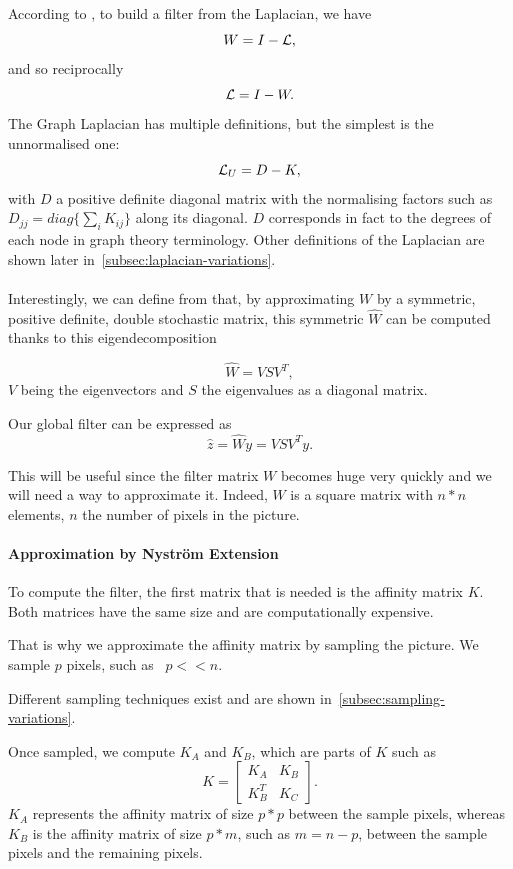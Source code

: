\paragraph{}
According to \cite{modern_tour_2013}, to build a filter from the Laplacian, we have
\[W = I - \operatorname{\mathcal{L}},\]
and so reciprocally
\[\operatorname{\mathcal{L}} = I - W.\]
The Graph Laplacian has multiple definitions, but the simplest is the unnormalised one:
\[\operatorname{\mathcal{L}}_U = D - K,\]
with \(D\) a positive definite diagonal matrix with the normalising factors such as \(D_{jj} = diag\{\sum_i K_{ij}\}\) along its diagonal.
\(D\) corresponds in fact to the degrees of each node in graph theory terminology.
Other definitions of the Laplacian are shown later in~\ref{subsec:laplacian-variations}.

\paragraph{}
Interestingly, we can define from \cite{glide_2014} that, by approximating \(W\) by a symmetric, positive definite, double stochastic matrix, this symmetric \(\hat{W}\) can be computed thanks to this eigendecomposition

\[\hat{W} = VSV^T,\]
\(V\) being the eigenvectors and \(S\) the eigenvalues as a diagonal matrix.

Our global filter can be expressed as
\[\hat{z} = \hat{W}y = VSV^Ty.\]

This will be useful since the filter matrix \(W\) becomes huge very quickly and we will need a way to approximate it. Indeed, \(W\) is a square matrix with \(n*n\) elements, \(n\) the number of pixels in the picture.

\paragraph{Approximation by Nystr\"om Extension}

To compute the filter, the first matrix that is needed is the affinity matrix \(K\).
Both matrices have the same size and are computationally expensive.

That is why we approximate the affinity matrix by sampling the picture.
We sample \(p\) pixels, such as  \(p << n\).

Different sampling techniques exist and are shown in~\ref{subsec:sampling-variations}.

Once sampled, we compute \(K_A\) and \(K_B\), which are parts of \(K\) such as
\[
 K = \begin{bmatrix}
  K_A & K_B \\
  K_B^T & K_C
 \end{bmatrix}.
\]
\(K_A\) represents the affinity matrix of size \(p*p\) between the sample pixels, whereas \(K_B\) is the affinity matrix of size \(p*m\), such as \(m = n-p\), between the sample pixels and the remaining pixels.

